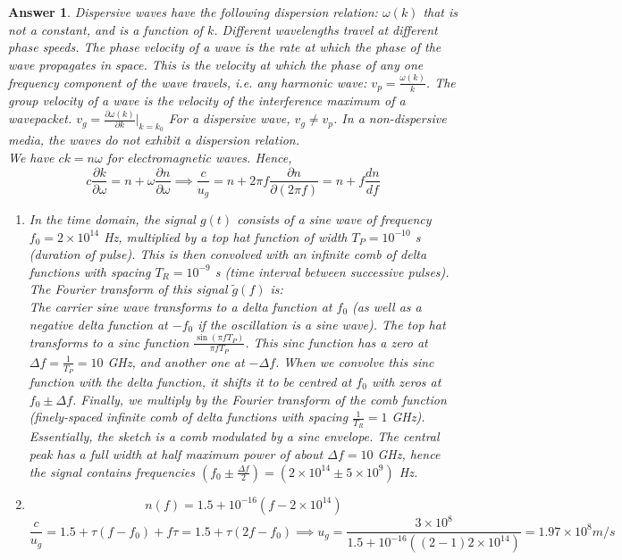 \documentclass[a4paper]{article}
\newtheorem{ans}{Answer}[section]
\theoremstyle{new}
\begin{document}
\begin{ans}
Dispersive waves have the following dispersion relation: $\omega(k)$ that is not a constant, and is a function of $k$. Different wavelengths travel at different phase speeds. The phase velocity of a wave is the rate at which the phase of the wave propagates in space. This is the velocity at which the phase of any one frequency component of the wave travels, i.e. any harmonic wave: $v_p=\frac{\omega(k)}{k}$. The group velocity of a wave is the velocity of the interference maximum of a wavepacket. $v_g=\frac{\partial\omega(k)}{\partial k}|_{k=k_0}$ For a dispersive wave, $v_g\neq v_p$. In a non-dispersive media, the waves do not exhibit a dispersion relation.\\[5pt]
We have $ck=n\omega$ for electromagnetic waves. Hence, 
$$c\frac{\partial k}{\partial\omega}=n+\omega\frac{\partial n}{\partial\omega}\implies\frac{c}{u_g}=n+2\pi f\frac{\partial n}{\partial(2\pi f)}=n+f\frac{dn}{df}$$
\begin{enumerate}[label=(\alph*)]
\item In the time domain, the signal $g(t)$ consists of a sine wave of frequency $f_0=2\times10^{14}$ Hz, multiplied by a top hat function of width $T_P=10^{-10}$ s (duration of pulse). This is then convolved with an infinite comb of delta functions with spacing $T_R=10^{-9}$ s (time interval between successive pulses). The Fourier transform of this signal $\tilde{g}(f)$ is:\\[5pt]
The carrier sine wave transforms to a delta function at $f_0$ (as well as a negative delta function at $-f_0$ if the oscillation is a sine wave). The top hat transforms to a sinc function $\frac{\sin(\pi fT_P)}{\pi fT_P}$. This sinc function has a zero at $\Delta f=\frac{1}{T_P}=10$ GHz, and another one at $-\Delta f$. When we convolve this sinc function with the delta function, it shifts it to be centred at $f_0$ with zeros at $f_0\pm \Delta f$. Finally, we multiply by the Fourier transform of the comb function (finely-spaced infinite comb of delta functions with spacing $\frac{1}{T_R}=1$ GHz). \\[5pt]
Essentially, the sketch is a comb modulated by a sinc envelope. The central peak has a full width at half maximum power of about $\Delta f=10$ GHz, hence the signal contains frequencies $(f_0\pm\frac{\Delta f}{2})=(2\times10^{14}\pm 5\times10^9)$ Hz.
\item 
$$n(f)=1.5+10^{-16}(f-2\times10^{14})$$
$$\frac{c}{u_g}=1.5+\tau(f-f_0)+f\tau=1.5+\tau(2f-f_0)\implies u_g=\frac{3\times10^8}{1.5+10^{-16}((2-1)2\times10^{14})}=1.97\times10^8 m/s$$

\end{enumerate}
\end{ans}
\end{document}
